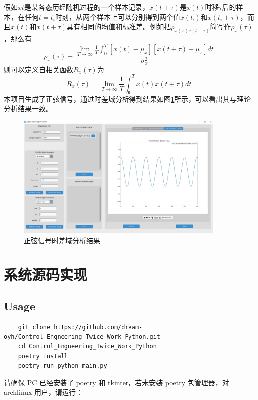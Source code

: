 \documentclass[12pt]{ctexart}
\begin{document}
假如$x{t}$是某各态历经随机过程的一个样本记录，$x(t+\tau)$是$x(t)$时移$\tau$后的样本，在任何$t=t_i$时刻，从两个样本上可以分别得到两个值$x(t_i)$和$x(t_i+\tau)$，而且$x(t)$和$x(t+\tau)$具有相同的均值和标准差。例如把$\rho_{x(x)x(t+\tau)}$简写作$\rho_x(\tau)$，那么有
\begin{equation}
  \rho_x(\tau)=\frac{\lim_{T\rightarrow \infty}\frac{1}{T}\int_0^T\left[x(t)-\mu_x\right]\left[x(t+\tau)-\mu_x\right]dt}{\sigma_x^2}
\end{equation}
则可以定义自相关函数$R_x(\tau)$为
\begin{equation}
  R_x(\tau)=\lim_{T\rightarrow \infty}\frac{1}{T}\int_0^Tx(t)x(t+\tau)dt
\end{equation}
本项目生成了正弦信号，通过时差域分析得到结果如图\ref{figure6}所示，可以看出其与理论分析结果一致。
\begin{figure}[htbp]
  \centering
  \includegraphics[width=0.9\textwidth]{img/sin_time_difference.png}
  \caption{正弦信号时差域分析结果}\label{figure6}
\end{figure}

\section{系统源码实现}

\subsection{Usage}

\begin{lstlisting}
    git clone https://github.com/dream-oyh/Control_Engneering_Twice_Work_Python.git
    cd Control_Engneering_Twice_Work_Python
    poetry install
    poetry run python main.py 
\end{lstlisting}

请确保 PC 已经安装了 poetry 和 tkinter，若未安装 poetry 包管理器，对 archlinux 用户，请运行：
\end{document}

